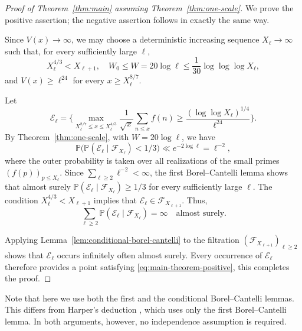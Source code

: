 \documentclass[a4paper,12pt,reqno]{amsart}
\numberwithin{equation}{section}
\theoremstyle{remark}
\newcommand{\p}{\mathbb{P}}
\begin{document}
\begin{proof}[Proof of Theorem~\ref{thm:main} assuming
Theorem~\ref{thm:one-scale}]
We prove the positive assertion; the negative assertion follows in exactly
the same way.

Since $V(x)\to\infty$, we may choose a deterministic increasing sequence
$X_\ell\to\infty$ such that, for every sufficiently large $\ell$,
\[
X_\ell^{4/3}<X_{\ell+1},\quad
W_0\leq W=20\log\ell\leq \frac1{30}\log\log\log X_\ell,
\]
and
$
V(x)\geq \ell^{24}$ for every $x\geq X_\ell^{8/7}.
$

Let
\[
\mathcal E_\ell=
\bigg\{
\max_{X_\ell^{8/7}\leq x\leq X_\ell^{4/3}}
\frac1{\sqrt{x}}\sum_{n\leq x}f(n)
\geq
\frac{(\log\log X_\ell)^{1/4}}{\ell^{24}}
\bigg\}.
\]
By Theorem~\ref{thm:one-scale},  with $W=20\log\ell$, we have %
\[
\p\big(
\p(\mathcal E_\ell\mid\mathscr F_{X_\ell})<1/3
\big)
\ll e^{-2\log\ell}
=\ell^{-2},
\]
where the outer probability is taken over all realizations of the small primes \((f(p))_{p\leq X_\ell}\).
Since $\sum_{\ell\geq2}\ell^{-2}<\infty$, the first Borel--Cantelli lemma
shows that almost surely \(\p(\mathcal E_\ell\mid\mathscr F_{X_\ell})\geq 1/3
\) for every sufficiently large $\ell$.
The condition $X_\ell^{4/3}<X_{\ell+1}$ implies that
$\mathcal E_\ell\in\mathscr F_{X_{\ell+1}}$.
Thus,
\[
\sum_{\ell\geq2}
\p(\mathcal E_\ell\mid\mathscr F_{X_\ell})
=\infty
\quad\text{almost surely}.
\]

Applying Lemma~\ref{lem:conditional-borel-cantelli} to the filtration
$(\mathscr F_{X_{\ell+1}})_{\ell\geq2}$ shows that
$\mathcal E_\ell$ occurs infinitely often almost surely.  Every occurrence of $\mathcal E_\ell$ therefore provides a point satisfying \eqref{eq:main-theorem-positive},  this completes the proof.
\end{proof}

Note that here we use both the first and the conditional
Borel--Cantelli lemmas. This differs from Harper's deduction
\cite{Harper2023Large}, which uses only the first Borel--Cantelli lemma.
In both arguments, however, no independence assumption is required.
\end{document}
